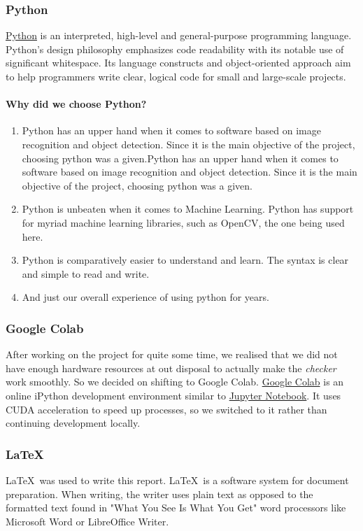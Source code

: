 \documentclass[a4paper]{article}
\begin{document}
\subsubsection{Python}
\href{https://www.python.org/}{Python} is an interpreted, high-level and general-purpose programming language.
Python's design philosophy emphasizes code readability with its notable use of significant whitespace. Its language constructs and object-oriented approach aim
to help programmers write clear, logical code for small and large-scale projects.

\paragraph{Why did we choose Python?}
\begin{enumerate}
    \item Python has an upper hand when it comes to software based on image recognition and object detection. Since it is the main
          objective of the project, choosing python was a given.Python has an upper hand when it comes to software based on
          image recognition and object detection. Since it is the main objective of the project, choosing python was a given.
    \item Python is unbeaten when it comes to Machine Learning. Python has support for myriad machine learning libraries, such as OpenCV, the
          one being used here.
    \item Python is comparatively easier to understand and learn. The syntax is clear and simple to read and write.
    \item And just our overall experience of using python for years.
\end{enumerate}

\subsubsection{Google Colab}
After working on the project for quite some time, we realised that we did not have enough hardware resources at out disposal to actually make the
\textit{checker} work smoothly. So we decided on shifting to Google Colab. \href{https://colab.research.google.com/notebooks/intro.ipynb}{Google Colab} is an online iPython development environment similar to \href{https://jupyter.org/}{Jupyter Notebook}. It uses CUDA acceleration to speed up processes, so we
switched to it rather than continuing development locally.

\subsubsection{\LaTeX}
\LaTeX\ was used to write this report. \LaTeX\ is a software system for document preparation. When writing, the writer uses plain text as opposed to the formatted
text found in "What You See Is What You Get" word processors like Microsoft Word or LibreOffice Writer.
\pagebreak
\end{document}

